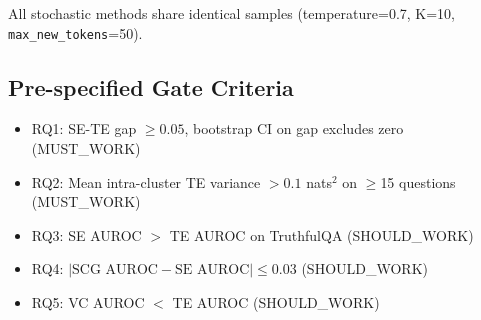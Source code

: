 All stochastic methods share identical samples (temperature=0.7, K=10, \texttt{max\_new\_tokens}=50).

\subsection{Pre-specified Gate Criteria}

\begin{itemize}
\item RQ1: SE-TE gap $\geq 0.05$, bootstrap CI on gap excludes zero (MUST\_WORK)
\item RQ2: Mean intra-cluster TE variance $> 0.1$ nats$^2$ on $\geq$15 questions (MUST\_WORK)
\item RQ3: SE AUROC $>$ TE AUROC on TruthfulQA (SHOULD\_WORK)
\item RQ4: $|\text{SCG AUROC} - \text{SE AUROC}| \leq 0.03$ (SHOULD\_WORK)
\item RQ5: VC AUROC $<$ TE AUROC (SHOULD\_WORK)
\end{itemize}
